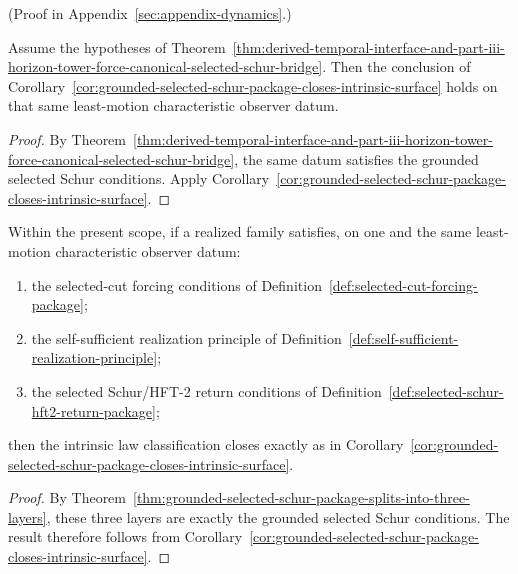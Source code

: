 (Proof in Appendix~\ref{sec:appendix-dynamics}.)

\begin{corollary}
\label{cor:derived-selected-schur-bridge-closes-intrinsic-surface}
Assume the hypotheses of
Theorem~\ref{thm:derived-temporal-interface-and-part-iii-horizon-tower-force-canonical-selected-schur-bridge}.
Then the conclusion of
Corollary~\ref{cor:grounded-selected-schur-package-closes-intrinsic-surface}
holds on that same least-motion characteristic observer datum.
\end{corollary}

\begin{proof}
By
Theorem~\ref{thm:derived-temporal-interface-and-part-iii-horizon-tower-force-canonical-selected-schur-bridge},
the same datum satisfies the grounded selected Schur conditions. Apply
Corollary~\ref{cor:grounded-selected-schur-package-closes-intrinsic-surface}.
\end{proof}

\begin{corollary}
\label{cor:layered-selected-schur-realization-closes-intrinsic-surface}
Within the present scope, if a realized family satisfies, on one and
the same least-motion characteristic observer datum:
\begin{enumerate}[label=(\alph*), leftmargin=2em, itemsep=0.2em]
\item the selected-cut forcing conditions of
      Definition~\ref{def:selected-cut-forcing-package};
\item the self-sufficient realization principle of
      Definition~\ref{def:self-sufficient-realization-principle};
\item the selected Schur/HFT-2 return conditions of
      Definition~\ref{def:selected-schur-hft2-return-package};
\end{enumerate}
then the intrinsic law classification closes exactly as in
Corollary~\ref{cor:grounded-selected-schur-package-closes-intrinsic-surface}.
\end{corollary}

\begin{proof}
By
Theorem~\ref{thm:grounded-selected-schur-package-splits-into-three-layers},
these three layers are exactly the grounded selected Schur conditions. The result
therefore follows from
Corollary~\ref{cor:grounded-selected-schur-package-closes-intrinsic-surface}.
\end{proof}


